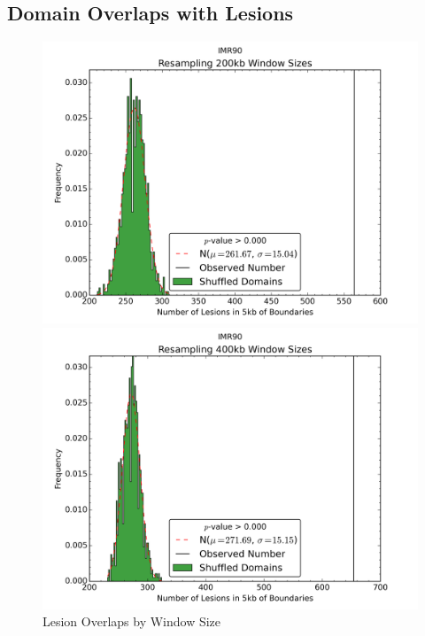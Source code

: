 \newpage
\subsection*{Domain Overlaps with Lesions}

\begin{figure}[H]
  \caption{Lesion Overlaps by Window Size}
  \begin{minipage}{0.5\textwidth}%
    \includegraphics[width=\textwidth]{./figures/supplementary/domains/boundaries-IMR90-200kb.png}
  \end{minipage}%
  \hfill
  \begin{minipage}{0.5\textwidth}
    \includegraphics[width=\textwidth]{./figures/supplementary/domains/boundaries-IMR90-400kb.png}
  \end{minipage}%


\end{figure}
